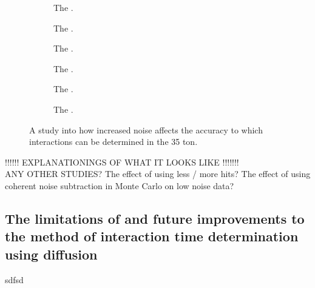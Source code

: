 \begin{figure}[h!]
  \centering
  \begin{subfigure}{0.45\textwidth}
    \centering
    \caption{The .}
    \label{fig:DiffLifetimeComp1}
  \end{subfigure}
  \hspace{0.08\textwidth}
  \begin{subfigure}{0.45\textwidth}
    \centering
    \caption{The .}
    \label{fig:DiffLifetimeComp2}
  \end{subfigure}
  \begin{subfigure}{0.45\textwidth}
    \centering
    \caption{The .}
    \label{fig:DiffLifetimeComp3}
  \end{subfigure}
  \hspace{0.08\textwidth}
  \begin{subfigure}{0.45\textwidth}
    \centering
    \caption{The .}
    \label{fig:DiffLifetimeComp4}
  \end{subfigure}
  \begin{subfigure}{0.45\textwidth}
    \centering
    \caption{The .}
    \label{fig:DiffLifetimeComp5}
  \end{subfigure}
  \hspace{0.08\textwidth}
  \begin{subfigure}{0.45\textwidth}
    \centering
    \caption{The .}
    \label{fig:DiffLifetimeComp6}
  \end{subfigure}
  \caption[The effect of increased noise in the accuracy of interaction time determination]
          {A study into how increased noise affects the accuracy to which interactions can be determined in the 35 ton.}
          \label{fig:DiffLifetimeComp}
\end{figure}

!!!!!! EXPLANATIONINGS OF WHAT IT LOOKS LIKE !!!!!!! \\

ANY OTHER STUDIES? The effect of using less / more hits? The effect of using coherent noise subtraction in Monte Carlo on low noise data?

\subsection{The limitations of and future improvements to the method of interaction time determination using diffusion} \label{sec:DiffLimitations}
sdfsd

